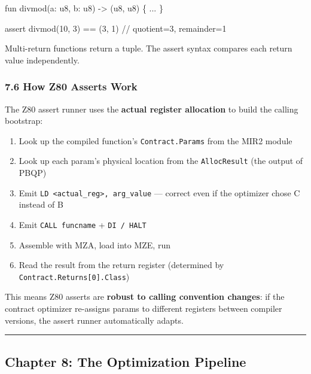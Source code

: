\documentclass[
  11pt,
  a4paper,
]{report}
\newenvironment{Shaded}{\begin{snugshade}\small}{\end{snugshade}}
\newcommand{\NormalTok}[1]{#1}
\providecommand{\tightlist}{%
  \setlength{\itemsep}{0pt}\setlength{\parskip}{0pt}}
\begin{document}
\begin{Shaded}
\begin{Highlighting}[]
\NormalTok{fun divmod(a: u8, b: u8) {-}\textgreater{} (u8, u8) \{ ... \}}

\NormalTok{assert divmod(10, 3) == (3, 1)   // quotient=3, remainder=1}
\end{Highlighting}
\end{Shaded}

Multi-return functions return a tuple. The assert syntax compares each
return value independently.

\subsubsection{7.6 How Z80 Asserts Work}\label{how-z80-asserts-work}

The Z80 assert runner uses the \textbf{actual register allocation} to
build the calling bootstrap:

\begin{enumerate}
\def\labelenumi{\arabic{enumi}.}
\tightlist
\item
  Look up the compiled function's \texttt{Contract.Params} from the MIR2
  module
\item
  Look up each param's physical location from the \texttt{AllocResult}
  (the output of PBQP)
\item
  Emit \texttt{LD\ \textless{}actual\_reg\textgreater{},\ arg\_value}
  --- correct even if the optimizer chose C instead of B
\item
  Emit \texttt{CALL\ funcname} + \texttt{DI\ /\ HALT}
\item
  Assemble with MZA, load into MZE, run
\item
  Read the result from the return register (determined by
  \texttt{Contract.Returns{[}0{]}.Class})
\end{enumerate}

This means Z80 asserts are \textbf{robust to calling convention
changes}: if the contract optimizer re-assigns params to different
registers between compiler versions, the assert runner automatically
adapts.

\begin{center}\rule{0.5\linewidth}{0.5pt}\end{center}

\subsection{Chapter 8: The Optimization
Pipeline}\label{chapter-8-the-optimization-pipeline}
\end{document}
